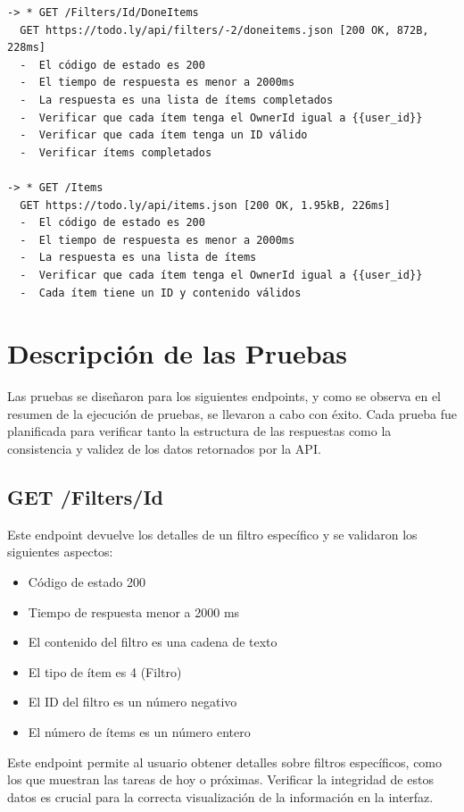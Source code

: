 \documentclass{report}
\begin{document}
\begin{verbatim}
-> * GET /Filters/Id/DoneItems
  GET https://todo.ly/api/filters/-2/doneitems.json [200 OK, 872B, 228ms]
  -  El código de estado es 200
  -  El tiempo de respuesta es menor a 2000ms
  -  La respuesta es una lista de ítems completados
  -  Verificar que cada ítem tenga el OwnerId igual a {{user_id}}
  -  Verificar que cada ítem tenga un ID válido
  -  Verificar ítems completados

-> * GET /Items
  GET https://todo.ly/api/items.json [200 OK, 1.95kB, 226ms]
  -  El código de estado es 200
  -  El tiempo de respuesta es menor a 2000ms
  -  La respuesta es una lista de ítems
  -  Verificar que cada ítem tenga el OwnerId igual a {{user_id}}
  -  Cada ítem tiene un ID y contenido válidos
\end{verbatim}

\section{Descripción de las Pruebas}
Las pruebas se diseñaron para los siguientes endpoints, y como se observa en el resumen de la ejecución de pruebas, se llevaron a cabo con éxito. Cada prueba fue planificada para verificar tanto la estructura de las respuestas como la consistencia y validez de los datos retornados por la API.

\subsection{GET /Filters/Id}
Este endpoint devuelve los detalles de un filtro específico y se validaron los siguientes aspectos:
\begin{itemize}
    \item Código de estado 200 \checkmark
    \item Tiempo de respuesta menor a 2000 ms \checkmark
    \item El contenido del filtro es una cadena de texto \checkmark
    \item El tipo de ítem es 4 (Filtro) \checkmark
    \item El ID del filtro es un número negativo \checkmark
    \item El número de ítems es un número entero \checkmark
\end{itemize}

Este endpoint permite al usuario obtener detalles sobre filtros específicos, como los que muestran las tareas de hoy o próximas. Verificar la integridad de estos datos es crucial para la correcta visualización de la información en la interfaz.
\end{document}
